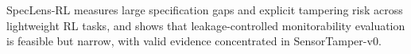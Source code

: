 SpecLens-RL measures large specification gaps and explicit tampering risk across lightweight RL tasks, and shows that leakage-controlled monitorability evaluation is feasible but narrow, with valid evidence concentrated in SensorTamper-v0.

